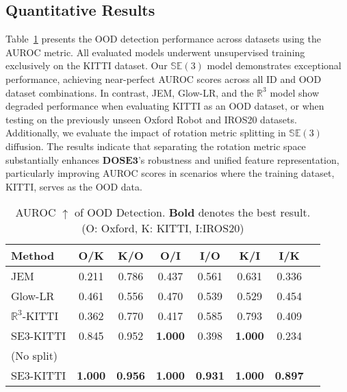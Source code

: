 \subsection{Quantitative Results}
Table~\ref{tab:results} presents the OOD detection performance across datasets using the AUROC metric. All evaluated models underwent unsupervised training exclusively on the KITTI dataset. Our $\mathbb{SE}(3)$ model demonstrates exceptional performance, achieving near-perfect AUROC scores across all \ac{ID} and \ac{OOD} dataset combinations. In contrast, JEM, Glow-LR, and the $\mathbb{R}^{3}$ model show degraded performance when evaluating KITTI as an \ac{OOD} dataset, or when testing on the previously unseen Oxford Robot and IROS20 datasets. Additionally, we evaluate the impact of rotation metric splitting in $\mathbb{SE}(3)$ diffusion. The results indicate that separating the rotation metric space substantially enhances $\mathbf{DOSE3}$'s robustness and unified feature representation, particularly improving AUROC scores in scenarios where the training dataset, KITTI, serves as the \ac{OOD} data.
\begin{table}[t]
\caption{AUROC $\uparrow$ of OOD Detection. $\textbf{Bold}$ denotes the best
result.\\(O: Oxford, K: KITTI, I:IROS20)}
    \vskip 0.15in
    \begin{adjustbox}{width=0.68\linewidth,center}
    \begin{tabular}{lccccccc}
    \toprule
        \textbf{Method} & \textbf{O/K} & \textbf{K/O} & \textbf{O/I} & \textbf{I/O} & \textbf{K/I} & \textbf{I/K}\\
    \midrule
        JEM & 0.211 & 0.786 & 0.437 & 0.561 & 0.631 & 0.336\\
        Glow-LR  & 0.461 & 0.556 & 0.470 & 0.539 & 0.529 & 0.454\\
    \midrule
        $\mathbb{R}^{3}$-KITTI  & 0.362 & 0.770 & 0.417 & 0.585 & 0.793 & 0.409\\
        SE3-KITTI  & 0.845 & 0.952 & \textbf{1.000} & 0.398 & \textbf{1.000} & 0.234\\
          (No split) &&&&&&\\
        SE3-KITTI  & \textbf{1.000} & \textbf{0.956} & \textbf{1.000} & \textbf{0.931} & \textbf{1.000} & \textbf{0.897}\\
    \bottomrule
    \end{tabular}
    \end{adjustbox}
    \vskip -0.1in
    \label{tab:results}
\end{table}

